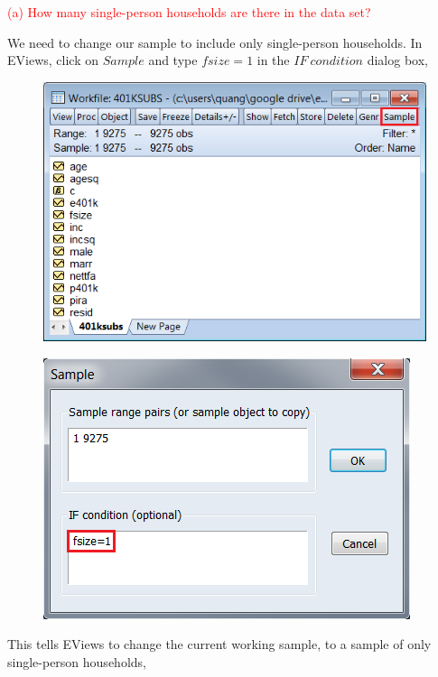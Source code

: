 \documentclass[12pt]{report}
\begin{document}
\noindent \textcolor{red}{(a) How many single-person households are there in the data set?}

\noindent We need to change our sample to include only single-person households. In EViews,
click on $Sample$ and type $fsize=1$ in the $IF\ condition$ dialog box,
\begin{figure}[H]
	\centering
	\includegraphics{tute6_q3_1}
\end{figure}
\vspace{-\baselineskip}
\begin{figure}[H]
	\centering
	\includegraphics{tute6_q3_2}
\end{figure}
\vspace{-\baselineskip}
\noindent This tells EViews to change the current working sample, to a sample of only single-person households,
\end{document}
